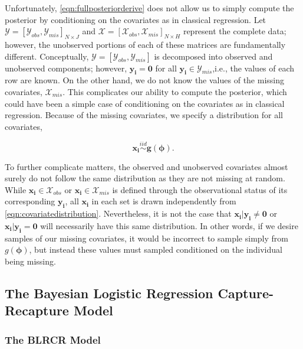 \documentclass[
  12pt,
]{article}
\begin{document}
Unfortunately, \autoref{eqn:fullposteriorderive} does not allow us to
simply compute the posterior by conditioning on the covariates as in
classical regression. Let
\(\mathcal{Y} = [\mathcal{Y}_{obs},\mathcal{Y}_{mis}]_{N \times J}\) and
\(\mathcal{X} = [\mathcal{X}_{obs},\mathcal{X}_{mis}]_{N \times H}\)
represent the complete data; however, the unobserved portions of each of
these matrices are fundamentally different. Conceptually,
\(\mathcal{Y} = [\mathcal{Y}_{obs},\mathcal{Y}_{mis}]\) is decomposed
into observed and unobserved components; however,
\(\boldsymbol{y_{i}=0}\) for all
\(\boldsymbol{y_{i}}\in \mathcal{Y}_{mis}\),i.e., the values of each row
are known. On the other hand, we do not know the values of the missing
covariates, \(\mathcal{X}_{mis}\). This complicates our ability to
compute the posterior, which could have been a simple case of
conditioning on the covariates as in classical regression. Because of
the missing covariates, we specify a distribution for all covariates,

\begin{equation}
\label{eqn:covariatedistribution}
\boldsymbol{x_i}\stackrel{iid}{\sim}\boldsymbol{g}(\boldsymbol{\phi}).
\end{equation}

To further complicate matters, the observed and unobserved covariates
almost surely do not follow the same distribution as they are not
missing at random. While \(\boldsymbol{x_i}\in\mathcal{X}_{obs}\) or
\(\boldsymbol{x_i}\in\mathcal{X}_{mis}\) is defined through the
observational status of its corresponding \(\boldsymbol{y_i}\), all
\(\boldsymbol{x_i}\) in each set is drawn independently from
\autoref{eqn:covariatedistribution}. Nevertheless, it is not the case
that \(\boldsymbol{x_{i}|y_i\ne 0}\) or \(\boldsymbol{x_{i}|y_i=0}\)
will necessarily have this same distribution. In other words, if we
desire samples of our missing covariates, it would be incorrect to
sample simply from \(g(\boldsymbol{\phi})\), but instead these values
must sampled conditioned on the individual being missing.

\subsection{The Bayesian Logistic Regression Capture-Recapture Model}
\label{Sec:BLRCRmodel}

\subsubsection{The BLRCR Model}
\end{document}
